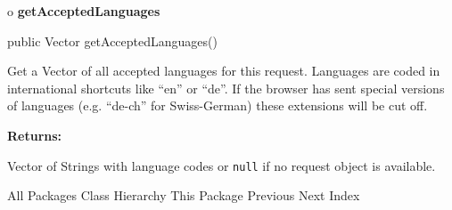 o {\bf getAcceptedLanguages} 

\begin{PRE}
 public Vector getAcceptedLanguages()
\end{PRE}

\begin{description}
\htmlDD Get a Vector of all accepted languages for this request. Languages are
coded in international shortcuts like ``en'' or ``de''. If the browser has
sent special versions of languages (e.g. ``de-ch'' for Swiss-German) these
extensions will be cut off. 

\begin{description}
\item {\bf Returns:}  

Vector of Strings with language codes or {\tt null} if no request object is
available.  
\end{description}

\end{description}

\htmlHR

\begin{PRE}
All Packages  Class Hierarchy  This Package  Previous  Next  Index
\end{PRE}

